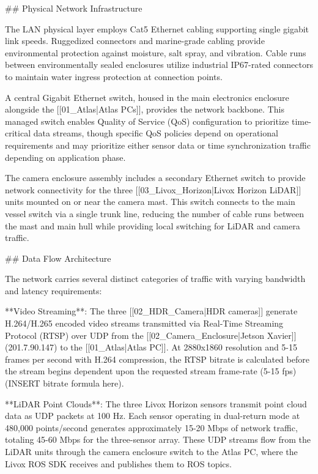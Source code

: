 \documentclass{erauthesis}
\begin{document}
## Physical Network Infrastructure

The LAN physical layer employs Cat5 Ethernet cabling supporting single gigabit link speeds. Ruggedized connectors and marine-grade cabling provide environmental protection against moisture, salt spray, and vibration. Cable runs between environmentally sealed enclosures utilize industrial IP67-rated connectors to maintain water ingress protection at connection points.

A central Gigabit Ethernet switch, housed in the main electronics enclosure alongside the [[01_Atlas|Atlas PCs]], provides the network backbone. This managed switch enables Quality of Service (QoS) configuration to prioritize time-critical data streams, though specific QoS policies depend on operational requirements and may prioritize either sensor data or time synchronization traffic depending on application phase.

The camera enclosure assembly includes a secondary Ethernet switch to provide network connectivity for the three [[03_Livox_Horizon|Livox Horizon LiDAR]] units mounted on or near the camera mast. This switch connects to the main vessel switch via a single trunk line, reducing the number of cable runs between the mast and main hull while providing local switching for LiDAR and camera traffic.

## Data Flow Architecture

The network carries several distinct categories of traffic with varying bandwidth and latency requirements:

**Video Streaming**: The three [[02_HDR_Camera|HDR cameras]] generate H.264/H.265 encoded video streams transmitted via Real-Time Streaming Protocol (RTSP) over UDP from the [[02_Camera_Enclosure|Jetson Xavier]] (201.7.90.147) to the [[01_Atlas|Atlas PC]]. At 2880x1860 resolution and 5-15 frames per second with H.264 compression, the RTSP bitrate is calculated before the stream begins dependent upon the requested stream frame-rate (5-15 fps) (INSERT bitrate formula here).

**LiDAR Point Clouds**: The three Livox Horizon sensors transmit point cloud data as UDP packets at 100 Hz. Each sensor operating in dual-return mode at 480,000 points/second generates approximately 15-20 Mbps of network traffic, totaling 45-60 Mbps for the three-sensor array. These UDP streams flow from the LiDAR units through the camera enclosure switch to the Atlas PC, where the Livox ROS SDK receives and publishes them to ROS topics.
\end{document}
